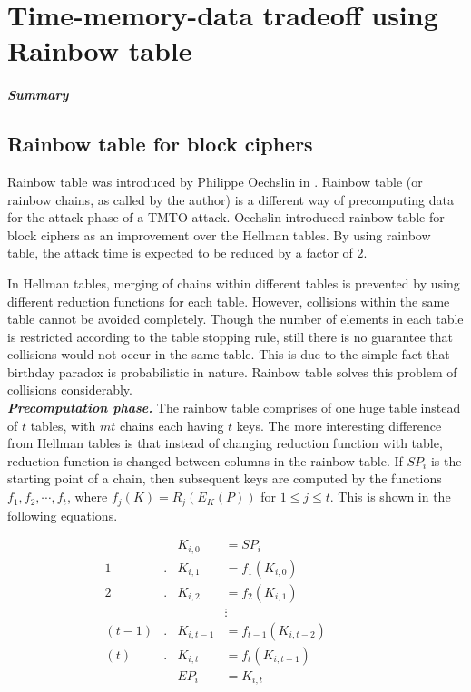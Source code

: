 \chapter{Time-memory-data tradeoff using Rainbow table}
\label{chapter:tmdto-rainbow}

\paragraph{Summary}


\section{Rainbow table for block ciphers}
\label{sec:rainbow-block}

Rainbow table was introduced by Philippe Oechslin in \cite{oechslin:mfc}. Rainbow table (or rainbow chains, as called by the author) is a different way of precomputing data for the attack phase of a TMTO attack. Oechslin introduced rainbow table for block ciphers as an improvement over the Hellman tables. By using rainbow table, the attack time is expected to be reduced by a factor of $2$.

In Hellman tables, merging of chains within different tables is prevented by using different reduction functions for each table. However, collisions within the same table cannot be avoided completely. Though the number of elements in each table is restricted according to the table stopping rule, still there is no guarantee that collisions would not occur in the same table. This is due to the simple fact that birthday paradox is probabilistic in nature. Rainbow table solves this problem of collisions considerably.\\

\noindent \textit{\textbf{Precomputation phase.}} The rainbow table comprises of one huge table instead of $t$ tables, with $mt$ chains each having $t$ keys. The more interesting difference from Hellman tables is that instead of changing reduction function with table, reduction function is changed between columns in the rainbow table. If $SP_i$ is the starting point of a chain, then subsequent keys are computed by the functions \mbox{$f_1, f_2, \cdots, f_t$}, where $f_j(K) = R_j(E_{K}(P))$ for $1 \leq j \leq t$. This is shown in the following equations. 

\begin{align*}
& & K_{i,0} & = SP_i & & & &\\
1&. &K_{i,1} & = f_1(K_{i,0}) & & & &\\
2&. &K_{i,2} & = f_2(K_{i,1}) & & & &\\
& & &\vdots & & & &\\
(t-1)&. &K_{i,t-1} & = f_{t-1}(K_{i,t-2}) & & & &\\
(t)&. &K_{i,t} & = f_t(K_{i,t-1}) & & & &\\
& & EP_i & = K_{i,t} & & & &\\
\end{align*}

